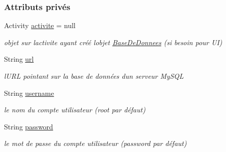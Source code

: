 \subsubsection*{Attributs privés}
\begin{DoxyCompactItemize}
\item 
Activity \hyperlink{classfr_1_1campus_1_1laurainc_1_1honeybee_1_1_base_de_donnees_aad4fd29f29916bc4277fa16262d19431}{activite} = null
\begin{DoxyCompactList}\small\item\em objet sur l\textquotesingle{}activite ayant créé l\textquotesingle{}objet \hyperlink{classfr_1_1campus_1_1laurainc_1_1honeybee_1_1_base_de_donnees}{Base\+De\+Donnees} (si besoin pour UI) \end{DoxyCompactList}\item 
String \hyperlink{classfr_1_1campus_1_1laurainc_1_1honeybee_1_1_base_de_donnees_ad1d04b4da375002e91d8370b9d19918e}{url}
\begin{DoxyCompactList}\small\item\em l\textquotesingle{}U\+RL pointant sur la base de données d\textquotesingle{}un serveur My\+S\+QL \end{DoxyCompactList}\item 
String \hyperlink{classfr_1_1campus_1_1laurainc_1_1honeybee_1_1_base_de_donnees_a7d1662e10f11f740155774b625ed1a87}{username}
\begin{DoxyCompactList}\small\item\em le nom du compte utilisateur (root par défaut) \end{DoxyCompactList}\item 
String \hyperlink{classfr_1_1campus_1_1laurainc_1_1honeybee_1_1_base_de_donnees_af1bb604a666a7eee9edd93b6cafaf064}{password}
\begin{DoxyCompactList}\small\item\em le mot de passe du compte utilisateur (password par défaut) \end{DoxyCompactList}\end{DoxyCompactItemize}
